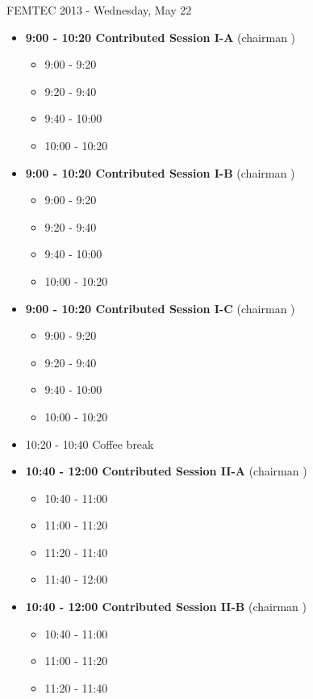 \documentclass[10pt, A4]{article}%
\begin{document}
\newpage

\centerline{\huge FEMTEC 2013 - Wednesday, May 22}
\vspace{4mm}

\begin{itemize}    
  \item {\bf 9:00 - 10:20 Contributed Session I-A} (chairman ) 
  \begin{itemize}
    \item 9:00 - 9:20 
    \item 9:20 - 9:40 
    \item 9:40 - 10:00 
    \item 10:00 - 10:20  
  \end{itemize}
  \item {\bf 9:00 - 10:20 Contributed Session I-B} (chairman ) 
  \begin{itemize}
    \item 9:00 - 9:20 
    \item 9:20 - 9:40 
    \item 9:40 - 10:00 
    \item 10:00 - 10:20      
  \end{itemize}
    \item {\bf 9:00 - 10:20 Contributed Session I-C} (chairman ) 
  \begin{itemize}
    \item 9:00 - 9:20 
    \item 9:20 - 9:40 
    \item 9:40 - 10:00 
    \item 10:00 - 10:20      
  \end{itemize}
  \item 10:20 - 10:40 Coffee break
  \item {\bf 10:40 - 12:00 Contributed Session II-A} (chairman ) 
  \begin{itemize}
    \item 10:40 - 11:00
    \item 11:00 - 11:20 
    \item 11:20 - 11:40 
    \item 11:40 - 12:00 
  \end{itemize}
  \item {\bf 10:40 - 12:00 Contributed Session II-B} (chairman ) 
  \begin{itemize}
    \item 10:40 - 11:00
    \item 11:00 - 11:20 
    \item 11:20 - 11:40 

\end{itemize}
\end{itemize}
\end{document}
